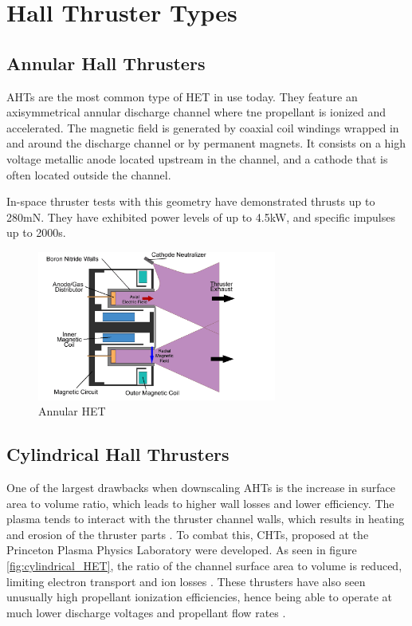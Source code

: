 \section{Hall Thruster Types}
\subsection{Annular Hall Thrusters}
\ac{AHT}s are the most common type of \ac{HET} in use today. They feature an axisymmetrical annular discharge channel where tne propellant is ionized and accelerated. The magnetic field is generated by coaxial coil windings wrapped in and around the discharge channel or by permanent magnets. It consists on a high voltage metallic anode located upstream in the channel, and a cathode that is often located outside the channel.

In-space thruster tests with this geometry have demonstrated thrusts up to 280mN. They have exhibited power levels of up to 4.5kW, and specific impulses up to 2000s. \cite{bpt-4000} \cite{spt-140} \\

\begin{figure}[H]
    \centering
    \includegraphics[width=0.7\textwidth]{images/Concepts/Annular HET.png}
    \captionsetup{justification=centering}
    \caption{Annular \ac{HET}}
    \label{fig:annular_HET}
\end{figure}


\subsection{Cylindrical Hall Thrusters}

One of the largest drawbacks when downscaling \ac{AHT}s is the increase in surface area to volume ratio, which leads to higher wall losses and lower efficiency. The plasma tends to interact with the thruster channel walls, which results in heating and erosion of the thruster parts \cite{cht-plasma-wall-interactions}. To combat this, \ac{CHT}s, proposed at the Princeton Plasma Physics Laboratory were developed. As seen in figure \ref{fig:cylindrical_HET}, the ratio of the channel surface area to volume is reduced, limiting electron transport and ion losses \cite{pppl-cht}. These thrusters have also seen unusually high propellant ionization efficiencies, hence being able to operate at much lower discharge voltages and propellant flow rates \cite{cht-vs-aht}.

